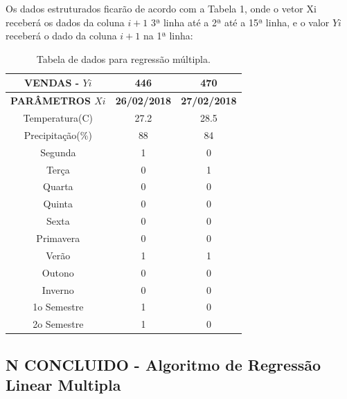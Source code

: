 \documentclass[	12pt, Times, openright, twoside, a4paper, english, brazil]{abntex2}
\begin{document}
          Os dados estruturados ficarão de acordo com a Tabela 1, onde o vetor Xi receberá os dados da coluna $i+1$ 3ª linha até a 2ª até a 15ª linha, e o valor $Yi$ receberá o dado da coluna $i+1$ na 1ª linha:
          \begin{table}[!ht]
          	\centering
          		\caption{Tabela de dados para regressão múltipla.}	\label{tab:regressaoMultipla}
                  
          				\begin{tabular}{|c|c|c|}
          			\hline \textbf{VENDAS - $Yi$}   &\textbf{446} &\textbf{470}\\
          			\hline \textbf{PARÂMETROS $Xi$}   &\textbf{26/02/2018} &\textbf{27/02/2018}\\
          			\hline Temperatura(C)      &27.2 	 			& 28.5\\
          			\hline Precipitação(\%)    & 88         		& 84\\

          			\hline Segunda             & 1          		& 0\\
          			\hline Terça               & 0          		& 1\\
          			\hline Quarta              & 0          		& 0\\
          			\hline Quinta              & 0          		& 0\\
          			\hline Sexta               & 0          		& 0\\

          			\hline Primavera           & 0          		& 0\\
          			\hline Verão               & 1          		& 1\\
          			\hline Outono              & 0          		& 0\\
          			\hline Inverno             & 0          		& 0\\

          			\hline 1o Semestre         & 1          		& 0\\
          			\hline 2o Semestre         & 1          		& 0\\
          		\end{tabular}
          \end{table}
          \tex

        \subsection{N CONCLUIDO - Algoritmo de Regressão Linear Multipla}
\end{document}

